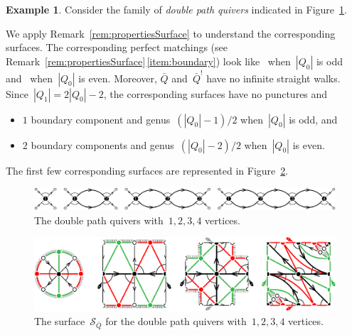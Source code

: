 \documentclass{amsart}
\theoremstyle{definition}
\newtheorem{example}[theorem]{Example}
\newcommand{\fref}[1]{Figure~\ref{#1}} %
\newcommand{\darkblue}{\color{darkblue}} %
\newcommand{\defn}[1]{\textsl{\darkblue #1}} %
\newcommand{\surface}{\mathcal{S}} %
\newcommand{\koszul}{^!} %
\begin{document}
\begin{example}
\label{exm:doublePath}
Consider the family of \defn{double path quivers} indicated in \fref{fig:doublePathsQuivers}.

We apply Remark~\ref{rem:propertiesSurface} to understand the corresponding surfaces.
The corresponding perfect matchings (see Remark~\ref{rem:propertiesSurface}\,\eqref{item:boundary}) look like~ when~$|Q_0|$ is odd and~ when~$|Q_0|$ is even.
Moreover, $\bar Q$ and~$\bar Q\koszul$ have no infinite straight walks.
Since~$|Q_1| = 2|Q_0|-2$, the corresponding surfaces have no punctures and
\begin{itemize}
\item $1$ boundary component and genus~$(|Q_0|-1)/2$ when~$|Q_0|$ is odd, and 
\item $2$ boundary components and genus~$(|Q_0|-2)/2$ when~$|Q_0|$ is even.
\end{itemize}
The first few corresponding surfaces are represented in \fref{fig:doublePathsSurfaces}.

\begin{figure}[h]
	\capstart
	\centerline{\includegraphics[scale=.45]{doublePathsQuivers}}
	\caption{The double path quivers with~$1, 2, 3, 4$ vertices.}
	\label{fig:doublePathsQuivers}
\end{figure}

\begin{figure}[h]
	\capstart
	\centerline{\includegraphics[scale=.7]{doublePathsSurfaces}}
	\caption{The surface~$\surface_{\bar Q}$ for the double path quivers with~$1, 2, 3, 4$ vertices.}
	\label{fig:doublePathsSurfaces}
\end{figure}
\end{example}
\end{document}
